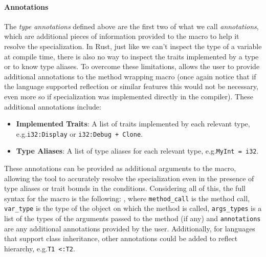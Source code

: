 \paragraph{Annotations}
The \textit{type annotations} defined above are the first two of what we call \textit{annotations}, which are additional pieces of information provided to the macro to help it resolve the specialization.
In Rust, just like we can't inspect the type of a variable at compile time, there is also no way to inspect the traits implemented by a type or to know type aliases.
To overcome these limitations, \mytool{} allows the user to provide additional annotations to the method wrapping macro (once again notice that if the language supported reflection or similar features this would not be necessary, even more so if specialization was implemented directly in the compiler).
These additional annotations include:
\begin{itemize}
	\item \textbf{Implemented Traits}: A list of traits implemented by each relevant type, e.g.\@ \mbox{\texttt{i32:\@ Display}} or \mbox{\texttt{i32:\@ Debug + Clone}}.
	\item \textbf{Type Aliases}: A list of type aliases for each relevant type, e.g.\@ \mbox{\texttt{MyInt = i32}}.
\end{itemize}
These annotations can be provided as additional arguments to the  macro, allowing the tool to accurately resolve the specialization even in the presence of type aliases or trait bounds in the conditions.
Considering all of this, the full syntax for the  macro is the following: , where \texttt{method\_call} is the method call, \texttt{var\_type} is the type of the object on which the method is called, \texttt{args\_types} is a list of the types of the arguments passed to the method (if any) and \texttt{annotations} are any additional annotations provided by the user.
Additionally, for languages that support class inheritance, other annotations could be added to reflect hierarchy, e.g.\@ \mbox{\texttt{T1 <:\@ T2}}.

